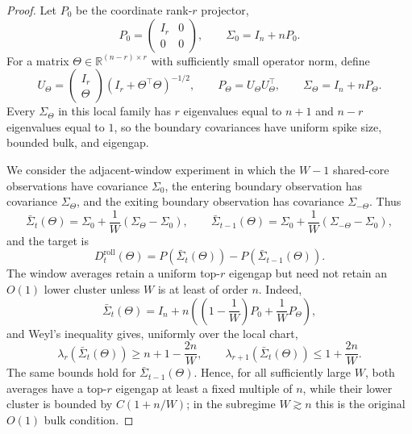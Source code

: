 \documentclass[11pt]{article}
\theoremstyle{tightplain}
\theoremstyle{tightdef}
\begin{document}
\begin{proof}
Let $P_0$ be the coordinate rank-$r$ projector,
\[
P_0=
\begin{pmatrix}
I_r&0\\
0&0
\end{pmatrix},
\qquad
\Sigma_0=I_n+nP_0.
\]
For a matrix $\Theta\in\mathbb R^{(n-r)\times r}$ with sufficiently small
operator norm, define
\[
U_\Theta=
\begin{pmatrix}
I_r\\
\Theta
\end{pmatrix}
(I_r+\Theta^\top\Theta)^{-1/2},
\qquad
P_\Theta=U_\Theta U_\Theta^\top,
\qquad
\Sigma_\Theta=I_n+nP_\Theta.
\]
Every $\Sigma_\Theta$ in this local family has $r$ eigenvalues equal to $n+1$
and $n-r$ eigenvalues equal to $1$, so the boundary covariances have uniform
spike size, bounded bulk, and eigengap.

We consider the adjacent-window experiment in which the $W-1$ shared-core
observations have covariance $\Sigma_0$, the entering boundary observation has
covariance $\Sigma_\Theta$, and the exiting boundary observation has covariance
$\Sigma_{-\Theta}$. Thus
\[
\bar\Sigma_t(\Theta)
=\Sigma_0+\frac1W(\Sigma_\Theta-\Sigma_0),
\qquad
\bar\Sigma_{t-1}(\Theta)
=\Sigma_0+\frac1W(\Sigma_{-\Theta}-\Sigma_0),
\]
and the target is
\[
D_t^{\mathrm{roll}}(\Theta)
=P(\bar\Sigma_t(\Theta))-P(\bar\Sigma_{t-1}(\Theta)).
\]
The window averages retain a uniform top-$r$ eigengap but need not retain an
$O(1)$ lower cluster unless $W$ is at least of order $n$. Indeed,
\[
\bar\Sigma_t(\Theta)=I_n+n\left(\left(1-\frac1W\right)P_0+\frac1W P_\Theta\right),
\]
and Weyl's inequality gives, uniformly over the local chart,
\[
\lambda_r(\bar\Sigma_t(\Theta))\ge n+1-\frac{2n}{W},
\qquad
\lambda_{r+1}(\bar\Sigma_t(\Theta))\le 1+\frac{2n}{W}.
\]
The same bounds hold for $\bar\Sigma_{t-1}(\Theta)$. Hence, for all sufficiently
large $W$, both averages have a top-$r$ eigengap at least a fixed multiple of
$n$, while their lower cluster is bounded by $C(1+n/W)$; in the subregime
$W\gtrsim n$ this is the original $O(1)$ bulk condition.


\end{proof}
\end{document}
